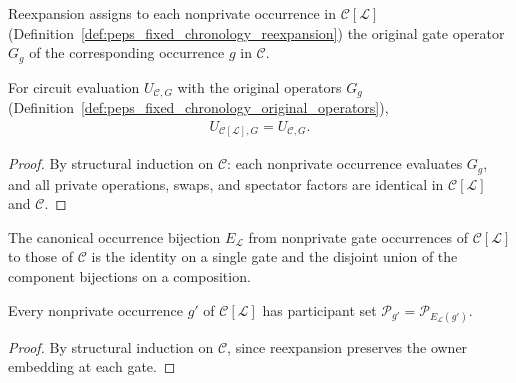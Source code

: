 \begin{definition}
    \label{def:peps_fixed_chronology_original_operators}
    \leanok
    Reexpansion assigns to each nonprivate occurrence in $\mathcal C[\mathcal L]$ (Definition~\ref{def:peps_fixed_chronology_reexpansion}) the original gate operator $G_g$ of the corresponding occurrence $g$ in $\mathcal C$.
\end{definition}

\begin{lemma}
    \label{thm:peps_fixed_chronology_evaluation}
    \leanok
    For circuit evaluation $U_{\mathcal C,G}$ with the original operators $G_g$ (Definition~\ref{def:peps_fixed_chronology_original_operators}),
    \begin{align}
        U_{\mathcal C[\mathcal L],G}=U_{\mathcal C,G}.
    \end{align}
\end{lemma}
\begin{proof}
    \leanok
    By structural induction on $\mathcal C$: each nonprivate occurrence evaluates $G_g$, and all private operations, swaps, and spectator factors are identical in $\mathcal C[\mathcal L]$ and $\mathcal C$.
\end{proof}

\begin{definition}
    \label{def:peps_fixed_chronology_occurrences}
    \leanok
    The canonical occurrence bijection $E_{\mathcal L}$ from nonprivate gate occurrences of $\mathcal C[\mathcal L]$ to those of $\mathcal C$ is the identity on a single gate and the disjoint union of the component bijections on a composition.
\end{definition}

\begin{lemma}
    \label{thm:peps_fixed_chronology_participants}
    \leanok
    Every nonprivate occurrence $g'$ of $\mathcal C[\mathcal L]$ has participant set $\mathcal P_{g'}=\mathcal P_{E_{\mathcal L}(g')}$.
\end{lemma}
\begin{proof}
    \leanok
    By structural induction on $\mathcal C$, since reexpansion preserves the owner embedding at each gate.
\end{proof}

